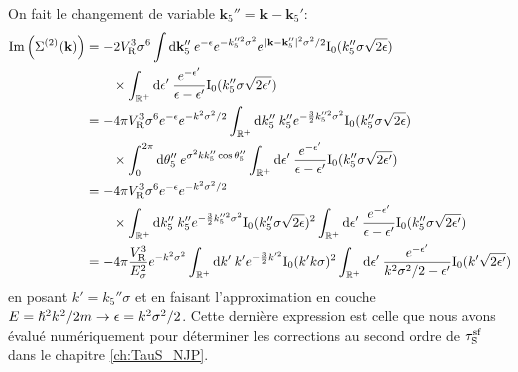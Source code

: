 On fait le changement de variable $\mathbf{k}_{\mathrm{5}}''=\mathbf{k}-\mathbf{k}_{\mathrm{5}}'$:
\begin{align}
\mathrm{Im}\left( \Sigma^{(2)}(\mathbf{k})\right)&= -2V_{\mathrm{R}}^3\sigma^6 \int{\mathop{}\mathopen{}\mathrm{d}\mathbf{k}_{\mathrm{5}}'' \: e^{-\epsilon} e^{-k_{\mathrm{5}}''^2\sigma^2} e^{|\mathbf{k}-\mathbf{k}_{\mathrm{5}}''|^2\sigma^2/2} \mathrm{I_0}(k_{\mathrm{5}}''\sigma \sqrt{2\epsilon})} \\
&\nonumber\qquad \times \int_{\mathbb{R}^+}{\mathop{}\mathopen{}\mathrm{d}\epsilon' \: \frac{e^{-\epsilon'}}{\epsilon-\epsilon'} \mathrm{I_0}(k_{\mathrm{5}}'' \sigma \sqrt{2\epsilon'})} \\
&=-4 \pi V_{\mathrm{R}}^3\sigma^6 e^{-\epsilon} e^{-k^2\sigma^2/2} \int_{\mathbb{R}^+}{\mathop{}\mathopen{}\mathrm{d} k_{\mathrm{5}}'' \: k_{\mathrm{5}}'' e^{-\frac{3}{2}k_{\mathrm{5}}''^2 \sigma^2} \mathrm{I_0}(k_{\mathrm{5}}'' \sigma \sqrt{2\epsilon})} \\
&\nonumber \qquad \times \int_0^{2\pi}{\mathop{}\mathopen{}\mathrm{d}\theta_{\mathrm{5}}'' \: e^{\sigma^2 k k_{\mathrm{5}}'' \cos\theta_{\mathrm{5}}''} \int_{\mathbb{R}^+}{\mathop{}\mathopen{}\mathrm{d} \epsilon' \: \frac{e^{-\epsilon'}}{\epsilon-\epsilon'} \mathrm{I_0}(k_{\mathrm{5}}'' \sigma \sqrt{2\epsilon'})}} \\
&=-4 \pi V_{\mathrm{R}}^3\sigma^6 e^{-\epsilon} e^{-k^2\sigma^2/2} \\
&\nonumber \qquad \times\int_{\mathbb{R}^+}{\mathop{}\mathopen{}\mathrm{d} k_{\mathrm{5}}'' \: k_{\mathrm{5}}'' e^{-\frac{3}{2}k_{\mathrm{5}}''^2 \sigma^2} \mathrm{I_0}(k_{\mathrm{5}}'' \sigma \sqrt{2\epsilon})^2 \int_{\mathbb{R}^+}{\mathop{}\mathopen{}\mathrm{d} \epsilon' \: \frac{e^{-\epsilon'}}{\epsilon-\epsilon'} \mathrm{I_0}(k_{\mathrm{5}}'' \sigma \sqrt{2\epsilon'})}} \\
&= -4 \pi \frac{V_{\mathrm{R}}^3}{E_{\sigma}^2} e^{-k^2\sigma^2} \int_{\mathbb{R}^+}{\mathop{}\mathopen{}\mathrm{d} k' \: k' e^{-\frac{3}{2}k'^2} \mathrm{I_0}(k' k \sigma)^2 \int_{\mathbb{R}^+}{\mathop{}\mathopen{}\mathrm{d} \epsilon' \: \frac{e^{-\epsilon'}}{k^2\sigma^2/2-\epsilon'} \mathrm{I_0}(k' \sqrt{2\epsilon'})}}
\end{align}
en posant $k'=k_{\mathrm{5}}''\sigma$ et en faisant l'approximation en couche $E=\hslash^2k^2/2m \rightarrow \epsilon=k^2\sigma^2/2$. Cette dernière expression est celle que nous avons évalué numériquement pour déterminer les corrections au second ordre de $\tau_{\mathrm{S}}^{\mathrm{sf}}$ dans le chapitre \ref{ch:TauS_NJP}.